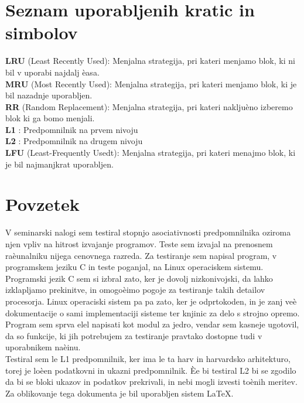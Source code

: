 \documentclass[12pt,a4paper,openany]{book}
\begin{document}

\chapter*{Seznam uporabljenih kratic in simbolov}

\thispagestyle{empty}

\textbf{LRU} (Least Recently Used): Menjalna strategija, pri kateri menjamo blok, ki ni bil v uporabi najdalj èasa.\\
\textbf{MRU} (Most Recently Used): Menjalna strategija, pri kateri menjamo blok, ki je bil nazadnje uporabljen.\\
\textbf{RR} (Random Replacement): Menjalna strategija, pri kateri nakljuèno izberemo blok ki ga bomo menjali.\\
\textbf{L1} : Predpomnilnik na prvem nivoju\\
\textbf{L2} : Predpomnilnik na drugem nivoju\\
\textbf{LFU} (Least-Frequently Usedt): Menjalna strategija, pri kateri menajmo blok, ki je bil najmanjkrat uporabljen.

\clearpage{\pagestyle{empty}\cleardoublepage}


\setcounter{page}{1}

\chapter*{Povzetek}


V seminarski nalogi sem testiral stopnjo asociativnosti predpomnilnika oziroma njen vpliv na hitrost izvajanje programov. Teste sem
izvajal na prenosnem raèunalniku nijega cenovnega razreda. Za testiranje sem napisal program, v programskem jeziku C in teste poganjal,
na Linux operaciskem sistemu. Programski jezik C sem si izbral zato, ker je dovolj nizkonivojski, da lahko izklapljamo prekinitve, in
omogoèimo pogoje za testiranje takih detailov procesorja. Linux operaciski sistem pa pa zato, ker je odprtokoden, in je zanj veè dokumentacije
o sami implementaciji sisteme ter knjinic za delo s strojno opremo. Program sem sprva elel napisati kot modul za jedro, vendar sem kasneje 
ugotovil, da so funkcije, ki jih potrebujem za testiranje pravtako dostopne tudi v uporabnikem naèinu.\\
Testiral sem le L1 predpomnilnik, ker ima le ta harv in harvardsko arhitekturo, torej je loèen podatkovni in ukazni predpomnilnik.
Èe bi testiral L2 bi se zgodilo da bi se bloki ukazov in podatkov prekrivali, in nebi mogli izvesti toènih meritev.
\\
Za oblikovanje tega dokumenta je bil uporabljen sistem \LaTeX.
\end{document}
